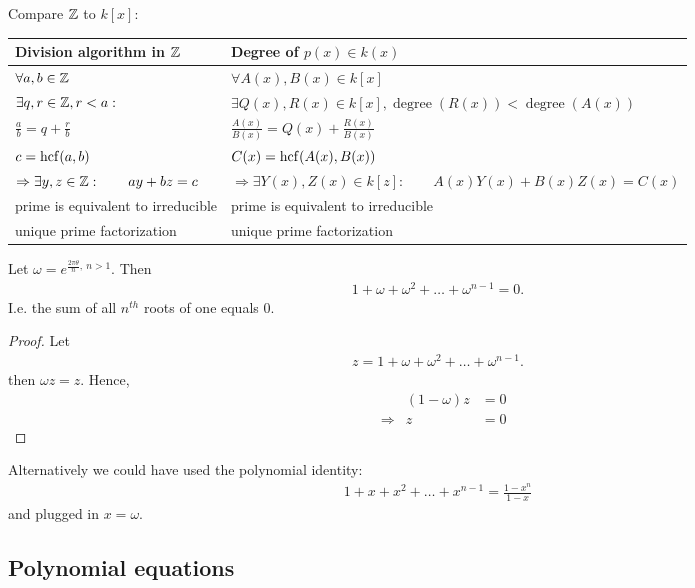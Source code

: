 Compare $\mathbb Z$ to $k[x]$:
\begin{center}
\begin{tabularx}{\textwidth}{XX}
	\toprule
	Division algorithm in $\mathbb Z$ & Degree of $p(x) \in k(x)$ \\
	\toprule
	$ \forall a,b \in \mathbb Z$ & $ \forall A(x),B(x) \in k[x]$  \\
	$\exists q,r \in \mathbb Z, r<a:$ & $\exists Q(x),R(x) \in k[x], \operatorname{degree}(R(x))<\operatorname{degree}(A(x))$ \\
	$\displaystyle \frac a b = q + \frac r b$ & $\displaystyle \frac{A(x)}{B(x)} = Q(x) + \frac{R(x)}{B(x)}$ \\
	\midrule
	$c = \operatorname{hcf}(a,b)$ & $C(x) = \operatorname{hcf}(A(x),B(x))$ \\
	$\Rightarrow \exists y,z \in \mathbb Z: \qquad ay+bz = c$ & $ \Rightarrow \exists Y(x), Z(x) \in k[z]: \qquad A(x) Y(x) + B(x) Z(x) = C(x)$  \\
	prime is equivalent to irreducible & prime is equivalent to irreducible \\
	unique prime factorization & unique prime factorization \\ 
	\bottomrule
\end{tabularx}
\end{center}


\begin{pp}
	Let $\omega = e^{\frac{2\pi \theta}{n},~n>1}$. Then
	\begin{align*}
	1+\omega+ \omega^2 + \dots + \omega^{n-1} = 0 .
	\end{align*}
	I.e. the sum of all $n^{th}$ roots of one equals 0.
\end{pp}

\begin{proof}
	Let 
	\begin{align*}
	z = 1+ \omega + \omega^2 + \dots + \omega^{n-1}.
	\end{align*}
	then $\omega  z = z$. Hence,
	\begin{align*}
	& & (1-\omega) z & = 0 \\
	& \Rightarrow & z & =0
	\end{align*}
\end{proof}


Alternatively we could have used the polynomial identity:
\begin{align*}
1+x+x^2+ \dots +x^{n-1} = \frac{1-x^n}{1-x}
\end{align*}
and plugged in $x= \omega$.

\subsection{Polynomial equations}


